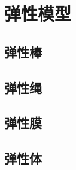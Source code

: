 

\section{弹性模型}\label{8-2}

\subsection{弹性棒}\label{8-2-1}

\subsection{弹性绳}\label{8-2-2}

\subsection{弹性膜}\label{8-2-3}

\subsection{弹性体}\label{8-2-4}